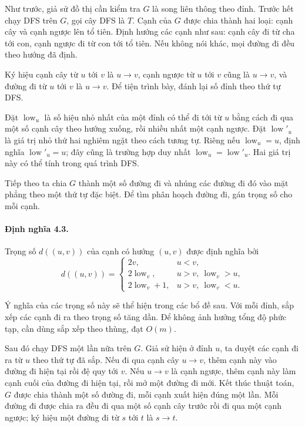 \documentclass[11pt]{article}
\begin{document}
Như trước, giả sử đồ thị cần kiểm tra $G$ là song liên thông theo đỉnh. Trước
hết chạy DFS trên $G$, gọi cây DFS là $T$. Cạnh của $G$ được chia thành hai
loại: cạnh cây và cạnh ngược lên tổ tiên. Định hướng các cạnh như sau: cạnh cây
đi từ cha tới con, cạnh ngược đi từ con tới tổ tiên. Nếu không nói khác, mọi
đường đi đều theo hướng đã định.

Ký hiệu cạnh cây từ $u$ tới $v$ là $u\to v$, cạnh ngược từ $u$ tới $v$ cũng là
$u\to v$, và đường đi từ $u$ tới $v$ là $u\to v$. Để tiện trình bày, đánh
lại số đỉnh theo thứ tự DFS.

Đặt $\operatorname{low}_u$ là số hiệu nhỏ nhất của một đỉnh có thể đi tới từ
$u$ bằng cách đi qua một số cạnh cây theo hướng xuống, rồi nhiều nhất một cạnh
ngược. Đặt $\operatorname{low}'_u$ là giá trị nhỏ thứ hai nghiêm ngặt theo cách
tương tự. Riêng nếu $\operatorname{low}_u=u$, định nghĩa
$\operatorname{low}'_u=u$; đây cũng là trường hợp duy nhất
$\operatorname{low}_u=\operatorname{low}'_u$. Hai giá trị này có thể tính trong
quá trình DFS.

Tiếp theo ta chia $G$ thành một số đường đi và nhúng các đường đi đó vào mặt
phẳng theo một thứ tự đặc biệt. Để tìm phân hoạch đường đi, gán trọng số cho
mỗi cạnh.

\paragraph{Định nghĩa 4.3.}
Trọng số $d((u,v))$ của cạnh có hướng $(u,v)$ được định nghĩa bởi
\[
d((u,v))=
\begin{cases}
2v, & u<v,\\
2\operatorname{low}_v, & u>v,\ \operatorname{low}_v>u,\\
2\operatorname{low}_v+1, & u>v,\ \operatorname{low}_v<u.
\end{cases}
\]

Ý nghĩa của các trọng số này sẽ thể hiện trong các bổ đề sau. Với mỗi đỉnh, sắp
xếp các cạnh đi ra theo trọng số tăng dần. Để không ảnh hưởng tổng độ phức tạp,
cần dùng sắp xếp theo thùng, đạt $O(m)$.

Sau đó chạy DFS một lần nữa trên $G$. Giả sử hiện ở đỉnh $u$, ta duyệt các cạnh
đi ra từ $u$ theo thứ tự đã sắp. Nếu đi qua cạnh cây $u\to v$, thêm cạnh này
vào đường đi hiện tại rồi đệ quy tới $v$. Nếu $u\to v$ là cạnh ngược, thêm cạnh
này làm cạnh cuối của đường đi hiện tại, rồi mở một đường đi mới. Kết thúc
thuật toán, $G$ được chia thành một số đường đi, mỗi cạnh xuất hiện đúng một
lần. Mỗi đường đi được chia ra đều đi qua một số cạnh cây trước rồi đi qua một
cạnh ngược; ký hiệu một đường đi từ $s$ tới $t$ là $s\to t$.
\end{document}
